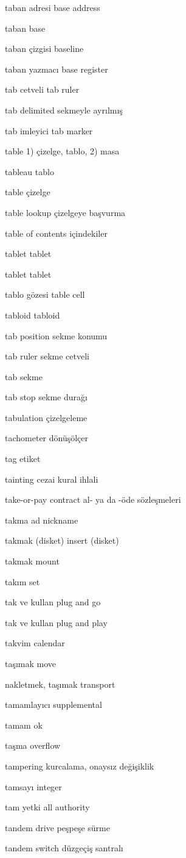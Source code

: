 \documentclass[12pt,fleqn]{article}\usepackage{../../common}
\begin{document}
taban adresi base address

taban base

taban çizgisi baseline

taban yazmacı base register

tab cetveli tab ruler

tab delimited sekmeyle ayrılmış

tab imleyici tab marker

table 1) çizelge, tablo, 2) masa

tableau tablo

table çizelge

table lookup çizelgeye başvurma

table of contents içindekiler

tablet tablet

tablet tablet

tablo gözesi table cell

tabloid tabloid

tab position sekme konumu

tab ruler sekme cetveli

tab sekme

tab stop sekme durağı

tabulation çizelgeleme

tachometer dönüşölçer

tag etiket

tainting cezai kural ihlali

take-or-pay contract al- ya da -öde sözleşmeleri

takma ad nickname

takmak (disket) insert (disket)

takmak mount

takım set

tak ve kullan plug and go

tak ve kullan plug and play

takvim calendar

taşımak move

nakletmek, taşımak transport

tamamlayıcı supplemental

tamam ok

taşma overflow

tampering kurcalama, onaysız değişiklik

tamsayı integer

tam yetki all authority

tandem drive peşpeşe sürme

tandem switch düzgeçiş santralı
\end{document}
